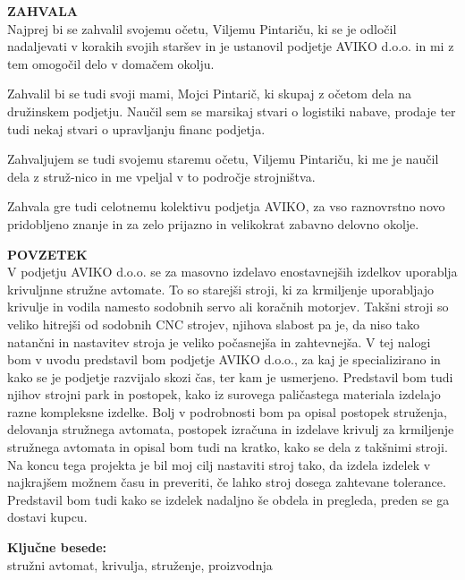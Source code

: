 \newpage
\textbf{\fontsize{14}{21}\selectfont ZAHVALA} \\
Najprej bi se zahvalil svojemu očetu, Viljemu Pintariču,
ki se je odločil nadaljevati v korakih svojih staršev in 
je ustanovil podjetje AVIKO d.o.o. in mi z tem omogočil delo
v domačem okolju.

Zahvalil bi se tudi svoji mami, Mojci Pintarič, ki skupaj z očetom
dela na družinskem podjetju. Naučil sem se marsikaj stvari o 
logistiki nabave, prodaje ter tudi nekaj stvari o upravljanju
financ podjetja.

Zahvaljujem se tudi svojemu staremu očetu, Viljemu Pintariču,
ki me je naučil dela z struž-nico in me vpeljal v to področje strojništva.

Zahvala gre tudi celotnemu kolektivu podjetja AVIKO, za vso
raznovrstno novo pridobljeno znanje in za zelo prijazno in velikokrat
zabavno delovno okolje.

\newpage
\textbf{\fontsize{14}{21}\selectfont POVZETEK} \\
V podjetju AVIKO d.o.o. se za masovno izdelavo enostavnejših 
izdelkov uporablja krivuljnne stružne avtomate. To so starejši 
stroji, ki za krmiljenje uporabljajo krivulje in vodila namesto 
sodobnih servo ali koračnih motorjev. Takšni stroji so veliko 
hitrejši od sodobnih CNC strojev, njihova slabost pa je, da niso 
tako natančni in nastavitev stroja je veliko počasnejša in zahtevnejša.
V tej nalogi bom v uvodu predstavil bom podjetje AVIKO d.o.o., 
za kaj je specializirano in kako se je podjetje razvijalo skozi 
čas, ter kam je usmerjeno. Predstavil bom tudi njihov strojni 
park in postopek, kako iz surovega paličastega materiala 
izdelajo razne kompleksne izdelke.
Bolj v podrobnosti bom pa opisal postopek struženja, delovanja
stružnega avtomata, postopek
izračuna in izdelave krivulj za krmiljenje stružnega avtomata in opisal
bom tudi na kratko, kako se dela z takšnimi stroji.
Na koncu tega projekta je bil moj cilj
nastaviti stroj tako, da izdela 
izdelek v najkrajšem možnem času in preveriti, če lahko stroj
dosega zahtevane tolerance. Predstavil bom tudi kako se
izdelek nadaljno še obdela in pregleda, preden se ga dostavi kupcu.

\textbf{\fontsize{14}{21}\selectfont Ključne besede:} \\
\fontsize{12}{16}stružni avtomat, krivulja, struženje, proizvodnja

